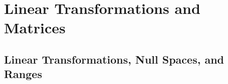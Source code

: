 \chapter{Linear Transformations and Matrices}
\thispagestyle{empty}
\newpage

\section{Linear Transformations, Null Spaces, and Ranges}



\vspace{12pt}

\setcounter{Exercise}{5}


\vspace{12pt}

\setcounter{Exercise}{10}


\vspace{12pt}



\vspace{12pt}

\setcounter{Exercise}{19}


\vspace{12pt}

\setcounter{Exercise}{21}


\vspace{12pt}

\setcounter{Exercise}{23}


\vspace{12pt}

\setcounter{Exercise}{34}


